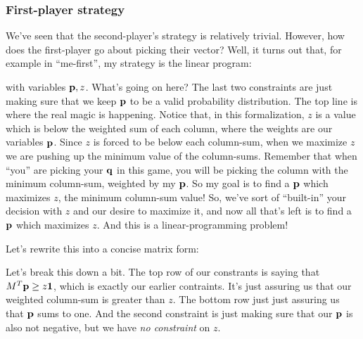 \subsubsection{First-player strategy}

We've seen that the second-player's strategy is relatively trivial. However,
how does the first-player go about picking their vector? Well, it turns out
that, for example in ``me-first'', my strategy is the linear program:
with variables $\mathbf{p}, z$. What's going on here? The last two constraints are just
making sure that we keep $\mathbf{p}$ to be a valid probability distribution. The top line
is where the real magic is happening. Notice that, in this formalization,
$z$ is a value which is below the weighted sum of each column, where the weights
are our variables $\mathbf{p}$. Since $z$ is forced to be below each column-sum, when
we maximize $z$ we are pushing up the minimum value of the column-sums. Remember that
when ``you'' are picking your $\mathbf{q}$ in this game, you will be picking the column
with the minimum column-sum, weighted by my $\mathbf{p}$. So my goal is to find a $\mathbf{p}$
which maximizes $z$, the minimum column-sum value!
So, we've sort of ``built-in'' your decision with $z$ and our desire to maximize
it, and now all that's left is to find a $\mathbf{p}$ which maximizes $z$. And this
is a linear-programming problem!

Let's rewrite this into a concise matrix form:

Let's break this down a bit. The top row of our constrants is saying that 
$M^T\mathbf{p} \geq z\mathbf{1}$, which is exactly our earlier contraints. It's just
assuring us that our weighted column-sum is greater than $z$. The bottom row
just just assuring us that $\mathbf{p}$ sums to one. And the second constraint is
just making sure that our $\mathbf{p}$ is also not negative, but we have \textit{
no constraint} on $z$.

